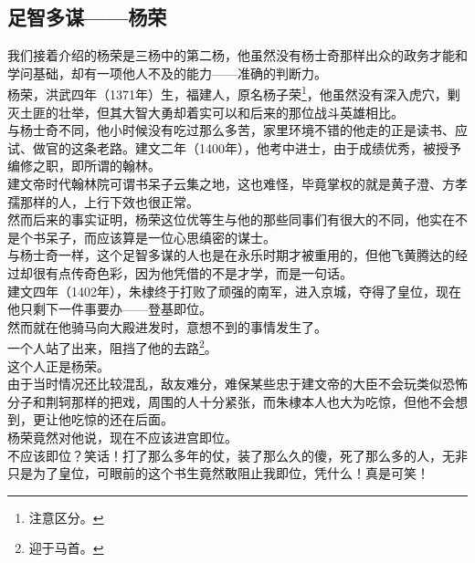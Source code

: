 \begin{multicols}{\theparacolNo}
\subsection{足智多谋——杨荣}
我们接着介绍的杨荣是三杨中的第二杨，他虽然没有杨士奇那样出众的政务才能和学问基础，却有一项他人不及的能力——准确的判断力。\\

杨荣，洪武四年（1371年）生，福建人，原名杨子荣\footnote{注意区分。}，他虽然没有深入虎穴，剿灭土匪的壮举，但其大智大勇却着实可以和后来的那位战斗英雄相比。\\

与杨士奇不同，他小时候没有吃过那么多苦，家里环境不错的他走的正是读书、应试、做官的这条老路。建文二年（1400年），他考中进士，由于成绩优秀，被授予编修之职，即所谓的翰林。\\

建文帝时代翰林院可谓书呆子云集之地，这也难怪，毕竟掌权的就是黄子澄、方孝孺那样的人，上行下效也很正常。\\

然而后来的事实证明，杨荣这位优等生与他的那些同事们有很大的不同，他实在不是个书呆子，而应该算是一位心思缜密的谋士。\\

与杨士奇一样，这个足智多谋的人也是在永乐时期才被重用的，但他飞黄腾达的经过却很有点传奇色彩，因为他凭借的不是才学，而是一句话。\\

建文四年（1402年），朱棣终于打败了顽强的南军，进入京城，夺得了皇位，现在他只剩下一件事要办——登基即位。\\

然而就在他骑马向大殿进发时，意想不到的事情发生了。\\

一个人站了出来，阻挡了他的去路\footnote{迎于马首。}。\\

这个人正是杨荣。\\

由于当时情况还比较混乱，敌友难分，难保某些忠于建文帝的大臣不会玩类似恐怖分子和荆轲那样的把戏，周围的人十分紧张，而朱棣本人也大为吃惊，但他不会想到，更让他吃惊的还在后面。\\

杨荣竟然对他说，现在不应该进宫即位。\\

不应该即位？笑话！打了那么多年的仗，装了那么久的傻，死了那么多的人，无非只是为了皇位，可眼前的这个书生竟然敢阻止我即位，凭什么！真是可笑！\\


\end{multicols}
